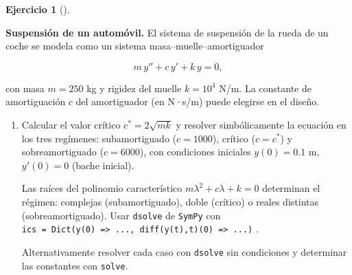 \documentclass[
  spanish,
  a4paper,
]{scrreport}
\theoremstyle{definition}
\newtheorem{exercise}{Ejercicio}[chapter]
\theoremstyle{remark}
\begin{document}
\begin{exercise}[]\protect\hypertarget{exr-amortiguacion-coche}{}\label{exr-amortiguacion-coche}

\textbf{Suspensión de un automóvil.} El sistema de suspensión de la
rueda de un coche se modela como un sistema masa--muelle--amortiguador

\[
m\,y'' + c\,y' + k\,y = 0,
\]

con masa \(m = 250\) kg y rigidez del muelle \(k = 10^4\) N/m. La
constante de amortiguación \(c\) del amortiguador (en N·s/m) puede
elegirse en el diseño.

\begin{enumerate}
\def\labelenumi{\alph{enumi}.}
\item
  Calcular el valor crítico \(c^* = 2\sqrt{mk}\) y resolver
  simbólicamente la ecuación en los tres regímenes: subamortiguado
  (\(c = 1000\)), crítico (\(c = c^*\)) y sobreamortiguado
  (\(c = 6000\)), con condiciones iniciales \(y(0) = 0.1\) m,
  \(y'(0)=0\) (bache inicial).

  \begin{tcolorbox}[enhanced jigsaw, arc=.35mm, bottomrule=.15mm, bottomtitle=1mm, breakable, colback=white, colbacktitle=quarto-callout-note-color!10!white, colframe=quarto-callout-note-color-frame, coltitle=black, left=2mm, leftrule=.75mm, opacityback=0, opacitybacktitle=0.6, rightrule=.15mm, title=\textcolor{quarto-callout-note-color}{\faInfo}\hspace{0.5em}{Ayuda}, titlerule=0mm, toprule=.15mm, toptitle=1mm]

  Las raíces del polinomio característico
  \(m\lambda^2 + c\lambda + k = 0\) determinan el régimen: complejas
  (subamortiguado), doble (crítico) o reales distintas
  (sobreamortiguado). Usar \texttt{dsolve} de \texttt{SymPy} con
  \texttt{ics\ =\ Dict(y(0)\ =\textgreater{}\ ...,\ diff(y(t),t)(0)\ =\textgreater{}\ ...)}
  .

  Alternativamente resolver cada caso con \texttt{dsolve} sin
  condiciones y determinar las constantes con \texttt{solve}.

  \end{tcolorbox}

  \begin{tcolorbox}[enhanced jigsaw, arc=.35mm, bottomrule=.15mm, bottomtitle=1mm, breakable, colback=white, colbacktitle=quarto-callout-tip-color!10!white, colframe=quarto-callout-tip-color-frame, coltitle=black, left=2mm, leftrule=.75mm, opacityback=0, opacitybacktitle=0.6, rightrule=.15mm, title=\textcolor{quarto-callout-tip-color}{\faLightbulb}\hspace{0.5em}{Solución}, titlerule=0mm, toprule=.15mm, toptitle=1mm]


\end{tcolorbox}
\end{enumerate}
\end{exercise}
\end{document}
